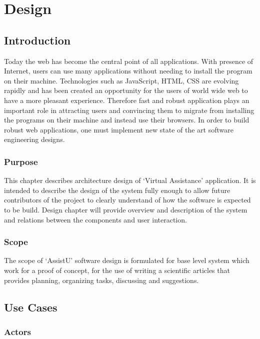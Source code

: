 \chapter{Design}

\section{Introduction} %
\label{sec:introduction}

Today the web has become the central point of all applications. With presence of Internet, users can use many applications without needing to install the program on their machine. Technologies such as JavaScript, HTML, CSS are evolving rapidly and has been created an opportunity for the users of world wide web to have a more pleasant experience. Therefore fast and robust application plays an important role in attracting users and convincing them to migrate from installing the programs on their machine and instead use their browsers. In order to build robust web applications,  one must implement new state of the art software engineering designs.

\subsection{Purpose} %
\label{sub:purpose}

This chapter describes architecture design of `Virtual Assistance' application. It is intended to describe the design of the system fully enough to allow future contributors of the project to clearly understand of how the software is expected to be build. Design chapter will provide overview and description of the system and relations between the components and user interaction. 

\subsection{Scope} %
\label{sub:scope}
The scope of `AssistU' software design is formulated for base level system which work for a proof of concept, for the use of writing a scientific articles that provides planning, organizing tasks, discussing and suggestions.



\section{Use Cases} %
\label{sec:system_overview}
\subsection{Actors} %
\label{sub:actors}
